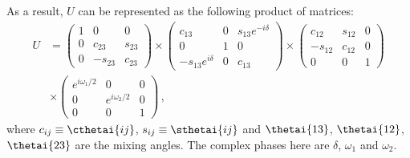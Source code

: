 As a result, $U$ can be represented as the following product of matrices:
\begin{align}
  U &=
  \begin{pmatrix}
    1 & 0       & 0 \\
    0 & c_{23}  & s_{23} \\
    0 & -s_{23} & c_{23}  
  \end{pmatrix}
  \times
  \begin{pmatrix}
    c_{13}             & 0 & s_{13}e^{-i\delta} \\
    0                  & 1 & 0 \\
    -s_{13}e^{i\delta} & 0 & c_{13}
  \end{pmatrix}
  \times
  \begin{pmatrix}
    c_{12}  & s_{12} & 0 \\
    -s_{12} & c_{12} & 0 \\
    0       & 0      & 1
  \end{pmatrix}
  \\
  &\times
  \begin{pmatrix}
    e^{i\omega_{1}/2} & 0                 & 0 \\
    0                 & e^{i\omega_{2}/2} & 0 \\
    0                 & 0                 & 1
  \end{pmatrix} \, ,
\end{align}
where $c_{ij} \equiv \cthetai{ij}$, $s_{ij} \equiv \sthetai{ij}$ and $\thetai{13}$, $\thetai{12}$, $\thetai{23}$ are the mixing angles.
The complex phases here are $\delta$, $\omega_{1}$ and $\omega_{2}$.

